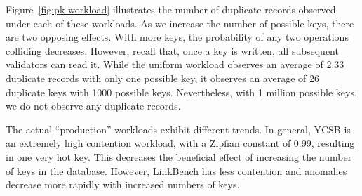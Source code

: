 Figure~\ref{fig:pk-workload} illustrates the number of duplicate
records observed under each of these workloads. As we increase the
number of possible keys, there are two opposing effects. With more
keys, the probability of any two operations colliding
decreases. However, recall that, once a key is written, all subsequent
validators can read it. While
the uniform workload observes an average of 2.33 duplicate records
with only one possible key, it observes an average of 26 duplicate
keys with 1000 possible keys. Nevertheless, with 1 million possible
keys, we do not observe any duplicate records.

The actual ``production'' workloads exhibit different trends. In
general, YCSB is an extremely high contention workload, with a Zipfian
constant of 0.99, resulting in one very hot key. This decreases the
beneficial effect of increasing the number of keys in the
database. However, LinkBench has less contention and anomalies decrease more
rapidly with increased numbers of keys.

